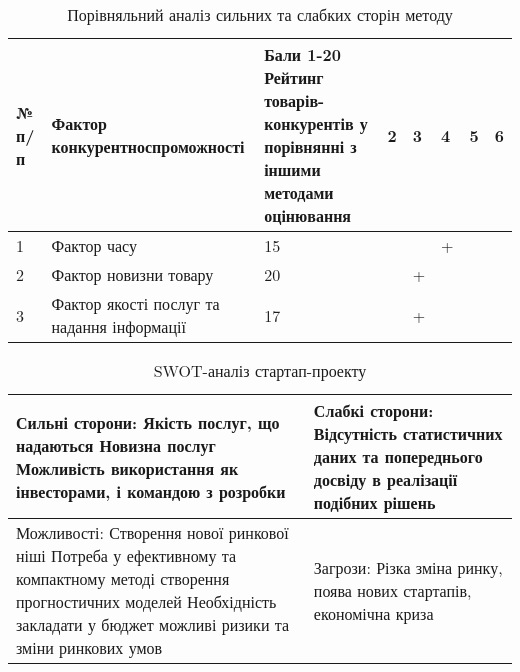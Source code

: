 \begin{table}
	\begin{tabularx}{\textwidth}{|l|X|X|X|X|X|X|X|}
    \hline
    № п/п & Фактор конкурентноспроможності & Бали 1-20 Рейтинг товарів-конкурентів у порівнянні з іншими методами оцінювання & 2 & 3 & 4 & 5 & 6 \\ \hline
    1 & Фактор часу & 15 & & & + & & \\ \hline
    2 & Фактор новизни товару & 20 & & + & & & \\ \hline
    3 & Фактор якості послуг та надання інформації & 17 & & + & & & \\
    \hline
    \end{tabularx}
\caption{Порівняльний аналіз сильних та слабких сторін методу} \label{tab:sometab}
\end{table}

\begin{table}
	\begin{tabularx}{\textwidth}{|X|X|}
    \hline
    Сильні сторони: 
    Якість послуг, що надаються
    Новизна послуг
    Можливість використання як інвесторами, і командою з розробки
     & Слабкі сторони:
     Відсутність статистичних даних та попереднього досвіду в реалізації подібних рішень \\ \hline
    Можливості: 
    Створення нової ринкової ніші
    Потреба у ефективному та компактному методі створення прогностичних моделей
    Необхідність закладати у бюджет можливі ризики та зміни ринкових умов
     & Загрози:
     Різка зміна ринку, поява нових стартапів, економічна криза \\
    \hline
    \end{tabularx}
\caption{SWOT-аналіз стартап-проекту} \label{tab:sometab}
\end{table}

